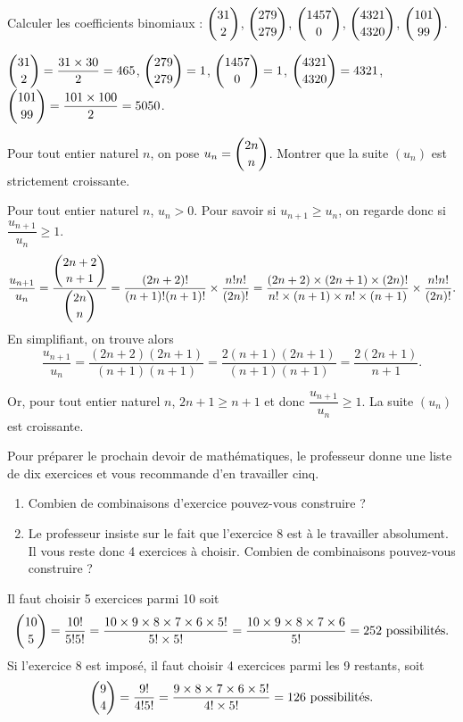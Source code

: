 \documentclass[11pt,fleqn, openany]{book} %
\begin{document}
\begin{exercise}[topic=comb03]Calculer les coefficients binomiaux : $\dbinom{31}{2}$, $\dbinom{279}{279}$, $\dbinom{1457}{0}$, $\dbinom{4321}{4320}$, $\dbinom{101}{99}$.\end{exercise}


\begin{solution}$\dbinom{31}{2}=\dfrac{31 \times 30 }{2} = 465$, $\dbinom{279}{279}=1$, $\dbinom{1457}{0}=1$, $\dbinom{4321}{4320}=4321$, $\dbinom{101}{99}=\dfrac{101 \times 100}{2}=5050$.\end{solution}




\begin{exercise}[topic=comb03]Pour tout entier naturel $n$, on pose $u_n=\dbinom{2n}{n}$. Montrer que la suite $(u_n)$ est strictement croissante.\end{exercise}

\begin{solution}Pour tout entier naturel $n$, $u_n>0$. Pour savoir si $u_{n+1} \geqslant u_n$, on regarde donc si $\dfrac{u_{n+1}}{u_n}\geqslant 1$.
\[ \dfrac{u_{n+1}}{u_n}=\dfrac{\dbinom{2n+2}{n+1}}{\dbinom{2n}{n}}=\dfrac{(2n+2)!}{(n+1)!(n+1)!} \times \dfrac{n! n!}{(2n)!}=\dfrac{(2n+2) \times (2n+1) \times (2n)!}{n! \times (n+1) \times n! \times (n+1)} \times \dfrac{n! n!}{(2n)!}.\]
En simplifiant, on trouve alors
\[ \dfrac{u_{n+1}}{u_n}=\dfrac{(2n+2)(2n+1)}{(n+1)(n+1)}=\dfrac{2(n+1)(2n+1)}{(n+1)(n+1)}=\dfrac{2(2n+1)}{n+1}.\]

Or, pour tout entier naturel $n$, $2n+1 \geqslant n+1$ et donc $\dfrac{u_{n+1}}{u_n}\geqslant 1$. La suite $(u_n)$ est croissante. \end{solution}



\begin{exercise}[topic=comb03]Pour préparer le prochain devoir de mathématiques, le professeur donne une liste de dix exercices et vous recommande d'en travailler cinq.
\begin{enumerate}
\item Combien de combinaisons d'exercice pouvez-vous construire ?
\item Le professeur insiste sur le fait que l'exercice 8 est à le travailler absolument. Il vous reste donc 4 exercices à choisir. Combien de combinaisons pouvez-vous construire ?
\end{enumerate}\end{exercise}

\begin{solution}Il faut choisir 5 exercices parmi 10 soit 
\[ \dbinom{10}{5}=\dfrac{10!}{5!5!}=\dfrac{10 \times 9 \times 8 \times 7 \times 6 \times 5!}{5!\times 5!}= \dfrac{10 \times 9 \times 8 \times 7 \times 6 }{ 5!}=252\text{ possibilités.}\]
Si l'exercice 8 est imposé, il faut choisir 4 exercices parmi les 9 restants, soit
\[ \dbinom{9}{4}=\dfrac{9!}{4!5!}=\dfrac{9 \times 8 \times 7 \times 6 \times 5!}{4!\times 5!}=126 \text{ possibilités.}\]\end{solution}
\end{document}
